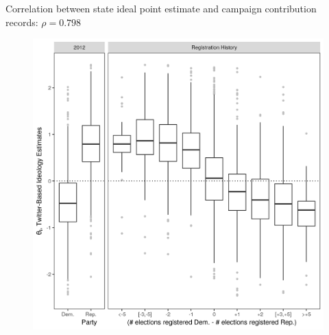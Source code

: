 \documentclass[../template.tex]{subfiles}
\begin{document}
Correlation between state ideal point estimate and campaign contribution records: \( \mathcal{\rho} = 0.798 \)

\begin{figure}[h]
\centering
\includegraphics[scale=.5]{images/box plot.png}
\end{figure}
\end{document}
